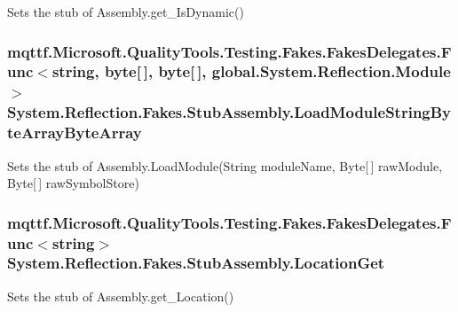 Sets the stub of Assembly.\-get\-\_\-\-Is\-Dynamic()

\hypertarget{class_system_1_1_reflection_1_1_fakes_1_1_stub_assembly_ab29060d20df2caf487cc9b8101538cea}{
\subsubsection[{Load\-Module\-String\-Byte\-Array\-Byte\-Array}]{\setlength{\rightskip}{0pt plus 5cm}mqttf.\-Microsoft.\-Quality\-Tools.\-Testing.\-Fakes.\-Fakes\-Delegates.\-Func$<$string, byte\mbox{[}$\,$\mbox{]}, byte\mbox{[}$\,$\mbox{]}, global.\-System.\-Reflection.\-Module$>$ System.\-Reflection.\-Fakes.\-Stub\-Assembly.\-Load\-Module\-String\-Byte\-Array\-Byte\-Array}}\label{class_system_1_1_reflection_1_1_fakes_1_1_stub_assembly_ab29060d20df2caf487cc9b8101538cea}


Sets the stub of Assembly.\-Load\-Module(\-String module\-Name, Byte\mbox{[}$\,$\mbox{]} raw\-Module, Byte\mbox{[}$\,$\mbox{]} raw\-Symbol\-Store)

\hypertarget{class_system_1_1_reflection_1_1_fakes_1_1_stub_assembly_aa3fddaee8f05a153671bc0e67a9ac5f0}{
\subsubsection[{Location\-Get}]{\setlength{\rightskip}{0pt plus 5cm}mqttf.\-Microsoft.\-Quality\-Tools.\-Testing.\-Fakes.\-Fakes\-Delegates.\-Func$<$string$>$ System.\-Reflection.\-Fakes.\-Stub\-Assembly.\-Location\-Get}}\label{class_system_1_1_reflection_1_1_fakes_1_1_stub_assembly_aa3fddaee8f05a153671bc0e67a9ac5f0}


Sets the stub of Assembly.\-get\-\_\-\-Location()

